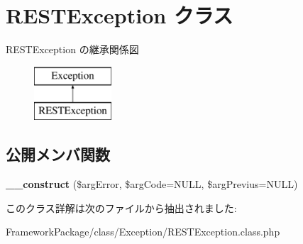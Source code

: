 \hypertarget{class_r_e_s_t_exception}{}\section{R\+E\+S\+T\+Exception クラス}
\label{class_r_e_s_t_exception}
R\+E\+S\+T\+Exception の継承関係図\begin{figure}[H]
\begin{center}
\leavevmode
\includegraphics[height=2.000000cm]{class_r_e_s_t_exception}
\end{center}
\end{figure}
\subsection*{公開メンバ関数}
\begin{DoxyCompactItemize}
\item 
\hypertarget{class_r_e_s_t_exception_acf96f079ad04da8dba02c62d65450c98}{}{\bfseries \+\_\+\+\_\+construct} (\$arg\+Error, \$arg\+Code=N\+U\+L\+L, \$arg\+Previus=N\+U\+L\+L)\label{class_r_e_s_t_exception_acf96f079ad04da8dba02c62d65450c98}

\end{DoxyCompactItemize}


このクラス詳解は次のファイルから抽出されました\+:\begin{DoxyCompactItemize}
\item 
Framework\+Package/class/\+Exception/R\+E\+S\+T\+Exception.\+class.\+php\end{DoxyCompactItemize}
